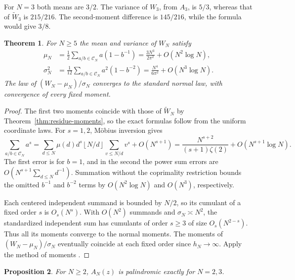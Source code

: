 \documentclass[11pt]{amsart}
\newtheorem{theorem}{Theorem}[section]
\newtheorem{proposition}[theorem]{Proposition}
\theoremstyle{remark}
\newcommand{\CN}{\mathcal C_N}
\begin{document}
For \(N=3\) both means are \(3/2\). The variance of \(W_3\), from \(A_3\),
is \(5/3\), whereas that of \(\widetilde W_3\) is \(215/216\).
The second-moment difference is \(145/216\), while the formula would
give \(3/8\).

\begin{theorem}\label{thm:residue-gaussian}
For \(N\ge5\) the mean and variance of \(W_N\) satisfy
\begin{align*}
 \mu_N&=\tfrac12\sum_{a/b\in\CN}a(1-b^{-1})
       =\frac{3N^3}{2\pi^2}+O(N^2\log N),\\
 \sigma_N^2&=\tfrac1{12}\sum_{a/b\in\CN}a^2(1-b^{-2})
       =\frac{N^4}{6\pi^2}+O(N^3\log N).
\end{align*}
The law of \((W_N-\mu_N)/\sigma_N\) converges to the standard normal
law, with convergence of every fixed moment.
\end{theorem}

\begin{proof}
The first two moments coincide with those of \(\widetilde W_N\) by
Theorem~\ref{thm:residue-moments}, so the exact formulas follow from
the uniform coordinate laws. For \(s=1,2\), M\"obius inversion gives
\[
 \sum_{a/b\in\CN}a^s
 =\sum_{d\le N}\mu(d)d^s\left\lfloor N/d\right\rfloor
    \sum_{v\le N/d}v^s+O(N^{s+1})
 =\frac{N^{s+2}}{(s+1)\zeta(2)}+O(N^{s+1}\log N).
\]
The first error is for \(b=1\), and in the second the power sum errors
are \(O(N^{s+1}\sum_{d\le N}d^{-1})\). Summation without the
coprimality restriction bounds the omitted \(b^{-1}\) and \(b^{-2}\)
terms by \(O(N^2\log N)\) and \(O(N^3)\), respectively.

Each centered independent summand is bounded by \(N/2\), so its
cumulant of a fixed order \(s\) is \(O_s(N^s)\). With \(O(N^2)\)
summands and \(\sigma_N\asymp N^2\), the standardized independent
sum has cumulants of order \(s\ge3\) of size \(O_s(N^{2-s})\).
Thus all its moments converge to the normal moments.
The moments of \((W_N-\mu_N)/\sigma_N\) eventually coincide at each
fixed order since \(h_N\to\infty\). Apply the method of moments
\cite{frechet-shohat}.
\end{proof}

\begin{proposition}\label{prop:residue-palindromic}
For \(N\ge2\), \(A_N(z)\) is palindromic exactly for \(N=2,3\).
\end{proposition}
\end{document}
